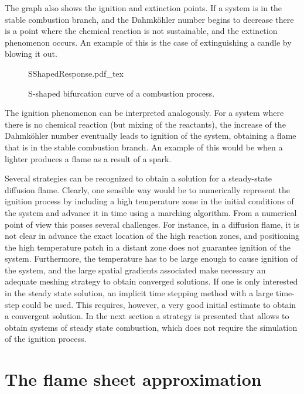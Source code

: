 The graph also shows the ignition and extinction points. If a system is in the stable combustion branch, and the Dahmköhler number begins to decrease there is a point where the chemical reaction is not sustainable, and the extinction phenomenon occurs. An example of this is the case of extinguishing a candle by blowing it out.
\begin{figure}[t]
	\begin{center}
		\def\svgwidth{0.5\textwidth}
		{SShapedResponse.pdf_tex}
		\caption{S-shaped bifurcation curve of a combustion process.}
		\label{fig:Sshaped}%
	\end{center}%
\end{figure}%
The ignition phenomenon can be interpreted analogously. For a system where there is no chemical reaction (but mixing of the reactants), the increase of the Dahmköhler number eventually leads to ignition of the system, obtaining a flame that is in the stable combustion branch. An example of this would be when a lighter produces a flame as a result of a spark. 

Several strategies can be recognized to obtain a solution for a steady-state diffusion flame. Clearly, one sensible way would be to numerically represent the ignition process by including a high temperature zone in the initial conditions of the system and advance it in time using a marching algorithm.  From a numerical point of view this posses several challenges. For instance, in a diffusion flame, it is not clear in advance the exact location of the high reaction zones, and positioning the high temperature patch in a distant zone does not guarantee ignition of the system. Furthermore, the temperature has to be large enough to cause ignition of the system, and the large spatial gradients associated make necessary an adequate meshing strategy to obtain converged solutions. If one is only interested in the steady state solution, an implicit time stepping method with a large time-step could be used. This requires, however, a very good initial estimate to obtain a convergent solution. In the next section a strategy is presented that allows to obtain systems of steady state combustion, which does not require the simulation of the ignition process.


\section{The flame sheet approximation} \label{sec:FlameSheet}


